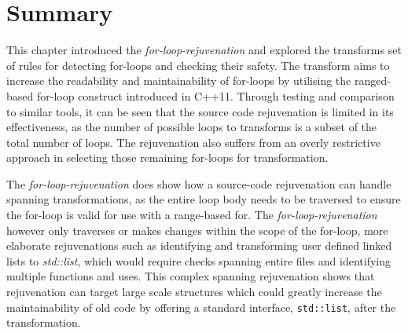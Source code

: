 \documentclass[bsc,frontabs,singlespacing,twoside,parskip,deptreport]{infthesis}
\begin{document}
\section{Summary}
This chapter introduced the \textit{for-loop-rejuvenation} and explored the transforms set of rules for detecting for-loops and checking their safety. The transform aims to increase the readability and maintainability of for-loops by utilising the ranged-based for-loop construct introduced in C++11. Through testing and comparison to similar tools, it can be seen that the source code rejuvenation is limited in its effectiveness, as the number of possible loops to transforms is a subset of the total number of loops. The rejuvenation also suffers from an overly restrictive approach in selecting those remaining for-loops for transformation.

The \textit{for-loop-rejuvenation} does show how a source-code rejuvenation can handle spanning transformations, as the entire loop body needs to be traversed to ensure the for-loop is valid for use with a range-based for. The \textit{for-loop-rejuvenation} however only traverses or makes changes within the scope of the for-loop, more elaborate rejuvenations such as identifying and transforming user defined linked lists to\textit{ std::list}, which would require checks spanning entire files and identifying multiple functions and uses. This complex spanning rejuvenation shows that rejuvenation can target large scale structures which could greatly increase the maintainability of old code by offering a standard interface, \texttt{std::list}, after the transformation.






\end{document}
